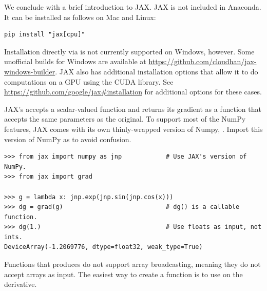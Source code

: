 We conclude with a brief introduction to JAX.
JAX is not included in Anaconda.
It can be installed as follows on Mac and Linux:
\begin{lstlisting}
pip install "jax[cpu]"
\end{lstlisting}
Installation directly via  is not currently supported on Windows, however.
Some unofficial builds for Windows are available at \url{https://github.com/cloudhan/jax-windows-builder}.
JAX also has additional installation options that allow it to do computations on a GPU using the CUDA library.
See \url{https://github.com/google/jax#installation} for additional options for these cases.


JAX's  accepts a scalar-valued function and returns its gradient as a function that accepts the same parameters as the original.
To support most of the NumPy features, JAX comes with its own thinly-wrapped version of Numpy, .
Import this version of NumPy as  to avoid confusion.

\begin{lstlisting}
>>> from jax import numpy as jnp            # Use JAX's version of NumPy.
>>> from jax import grad

>>> g = lambda x: jnp.exp(jnp.sin(jnp.cos(x)))
>>> dg = grad(g)                            # dg() is a callable function.
>>> dg(1.)                                  # Use floats as input, not ints.
DeviceArray(-1.2069776, dtype=float32, weak_type=True)
\end{lstlisting}

Functions that  produces do not support array broadcasting, meaning they do not accept arrays as input.
The easiest way to create a function is to use  on the derivative.

